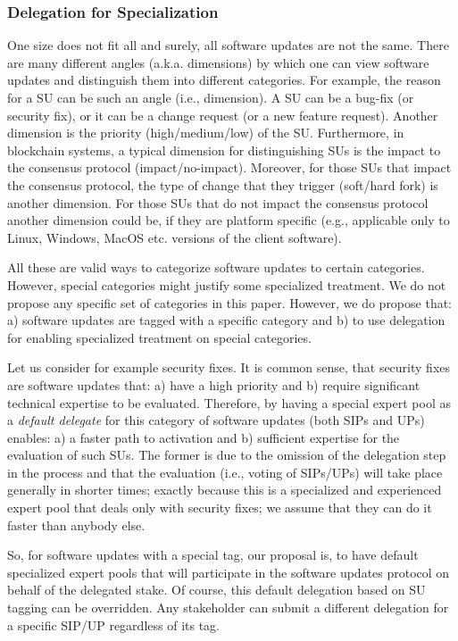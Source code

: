\subsubsection{Delegation for Specialization}
One size does not fit all and surely, all software updates are not the same. There are many different angles (a.k.a. dimensions) by which one can view software updates and distinguish them into different categories. For example, the reason for a SU can be such an angle (i.e., dimension). A SU can be a bug-fix (or security fix), or it can be a change request (or a new feature request). Another dimension is the priority (high/medium/low) of the SU. Furthermore, in blockchain systems, a typical dimension for distinguishing SUs is the impact to the consensus protocol (impact/no-impact). Moreover, for those SUs that impact the consensus protocol, the type of change that they trigger (soft/hard fork) is another dimension. For those SUs that do not impact the consensus protocol another dimension could be, if they are platform specific (e.g., applicable only to Linux, Windows, MacOS etc. versions of the client software). 

All these are valid ways to categorize software updates to certain categories. However, special categories might justify some specialized treatment. We do not propose any specific set of categories in this paper. However, we do propose that: a) software updates are tagged with a specific category and b) to use delegation for enabling specialized treatment on special categories.

Let us consider for example security fixes. It is common sense, that security fixes are software updates that: a) have a high priority and b) require significant technical expertise to be evaluated. Therefore, by having a special expert pool as a \emph{default delegate} for this category of software updates (both SIPs and UPs) enables: a) a faster path to activation and b) sufficient expertise for the evaluation of such SUs. The former is due to the omission of the delegation step in the process and that the evaluation (i.e., voting of SIPs/UPs) will take place generally in shorter times; exactly because this is a specialized and experienced expert pool that deals only with security fixes; we assume that they can do it faster than anybody else.

So, for software updates with a special tag, our proposal is, to have default specialized expert pools that will participate in the software updates protocol on behalf of the
 delegated stake. Of course, this default delegation based on SU tagging can be overridden. Any stakeholder can submit a different delegation for a specific SIP/UP regardless of its tag. 

